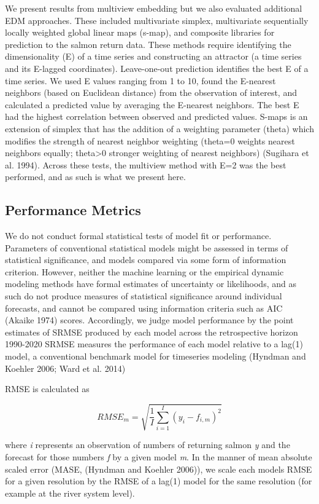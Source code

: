 \documentclass[
]{article}
\begin{document}
We present results from multiview embedding but we also evaluated additional EDM approaches. These included multivariate simplex, multivariate sequentially locally weighted global linear maps (s-map), and composite libraries for prediction to the salmon return data. These methods require identifying the dimensionality (E) of a time series and constructing an attractor (a time series and its E-lagged coordinates). Leave-one-out prediction identifies the best E of a time series. We used E values ranging from 1 to 10, found the E-nearest neighbors (based on Euclidean distance) from the observation of interest, and calculated a predicted value by averaging the E-nearest neighbors. The best E had the highest correlation between observed and predicted values. S-maps is an extension of simplex that has the addition of a weighting parameter (theta) which modifies the strength of nearest neighbor weighting (theta=0 weights nearest neighbors equally; theta\textgreater0 stronger weighting of nearest neighbors) (Sugihara et al. 1994). Across these tests, the multiview method with E=2 was the best performed, and as such is what we present here.

\hypertarget{performance-metrics}{%
\subsection{Performance Metrics}\label{performance-metrics}}

We do not conduct formal statistical tests of model fit or performance. Parameters of conventional statistical models might be assessed in terms of statistical significance, and models compared via some form of information criterion. However, neither the machine learning or the empirical dynamic modeling methods have formal estimates of uncertainty or likelihoods, and as such do not produce measures of statistical significance around individual forecasts, and cannot be compared using information criteria such as AIC (Akaike 1974) scores. Accordingly, we judge model performance by the point estimates of SRMSE produced by each model across the retrospective horizon 1990-2020 SRMSE measures the performance of each model relative to a lag(1) model, a conventional benchmark model for timeseries modeling (Hyndman and Koehler 2006; Ward et al. 2014)

RMSE is calculated as

\[RMSE_m = \sqrt{\frac{1}{I}\sum\limits_{i = 1}^I(y_{i} - f_{i,m})^2}\]

where \emph{i} represents an observation of numbers of returning salmon \emph{y} and the forecast for those numbers \emph{f} by a given model \emph{m}. In the manner of mean absolute scaled error (MASE, (Hyndman and Koehler 2006)), we scale each models RMSE for a given resolution by the RMSE of a lag(1) model for the same resolution (for example at the river system level).
\end{document}
